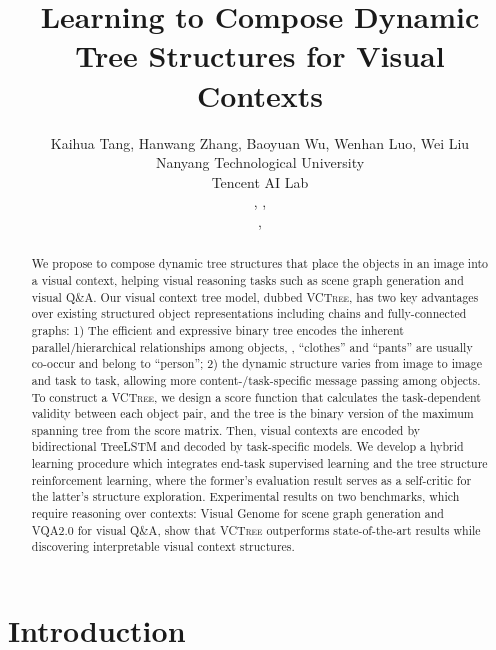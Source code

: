 \documentclass[10pt,twocolumn,letterpaper]{article}
\begin{document}
\title{Learning to Compose Dynamic Tree Structures for Visual Contexts}

\author{Kaihua Tang, Hanwang Zhang, Baoyuan Wu, Wenhan Luo, Wei Liu \\
 Nanyang Technological University \\
 Tencent AI Lab \\
, , \\
, 
}


\maketitle


\begin{abstract}
We propose to compose dynamic tree structures that place the objects in an image into a visual context, helping visual reasoning tasks such as scene graph generation and visual Q\&A.
Our visual context tree model, dubbed \textsc{VCTree}, has two key advantages over existing structured object representations including chains and fully-connected graphs: 1) The efficient and expressive binary tree encodes the inherent parallel/hierarchical relationships among objects, \eg, ``clothes'' and ``pants'' are usually co-occur and belong to ``person''; 2) the dynamic structure varies from image to image and task to task, allowing more content-/task-specific message passing among objects. To construct a \textsc{VCTree}, we design a score function that calculates the task-dependent validity between each object pair, and the tree is the binary version of the maximum spanning tree from the score matrix. Then, visual contexts are encoded by bidirectional TreeLSTM and decoded by task-specific models. We develop a hybrid learning procedure which integrates end-task supervised learning and the tree structure reinforcement learning, where the former's evaluation result serves as a self-critic for the latter's structure exploration.  Experimental results on two benchmarks, which require reasoning over contexts: Visual Genome for scene graph generation and VQA2.0 for visual Q\&A, show that \textsc{VCTree} outperforms state-of-the-art results while discovering interpretable visual context structures.
\end{abstract}

\section{Introduction}
\end{document}
